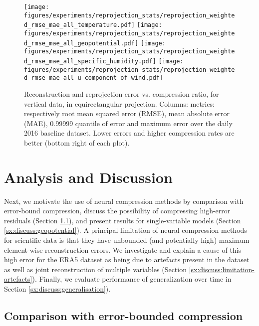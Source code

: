 \documentclass[11pt, a4paper, logo, copyright, numbering]{googledeepmind}
\begin{document}
\begin{figure}
    \centering
    \texttt{[image: figures/experiments/reprojection\_stats/reprojection\_weighted\_rmse\_mae\_all\_temperature.pdf]}
    \texttt{[image: figures/experiments/reprojection\_stats/reprojection\_weighted\_rmse\_mae\_all\_geopotential.pdf]}
    \texttt{[image: figures/experiments/reprojection\_stats/reprojection\_weighted\_rmse\_mae\_all\_specific\_humidity.pdf]}
    \texttt{[image: figures/experiments/reprojection\_stats/reprojection\_weighted\_rmse\_mae\_all\_u\_component\_of\_wind.pdf]}
    \hfill
    \caption{Reconstruction and reprojection error vs. compression ratio, for vertical data, in equirectangular projection. Columns: metrics: respectively root mean squared error (RMSE), mean absolute error (MAE), 0.99999 quantile of error and maximum error over the daily 2016 baseline dataset. Lower errors and higher compression rates are better (bottom right of each plot).}
    \label{fig:reprojection_error_vs_cr}
\end{figure}


 
\section{Analysis and Discussion}
\label{sx:discussion}

Next, we motivate the use of neural compression methods by comparison with error-bound compression, discuss the possibility of compressing high-error residuals (Section \ref{sx:discuss:error-bound}), and present results for single-variable models (Section \ref{sx:discuss:geopotential}). A principal limitation of  neural compression methods for scientific data is that they have unbounded (and potentially high) maximum element-wise reconstruction errors. We investigate and explain a cause of this high error for the ERA5 dataset as being due to artefacts present in the dataset as well as joint reconstruction of multiple variables (Section \ref{sx:discuss:limitation-artefacts}). Finally, we evaluate performance of generalization over time in Section \ref{sx:discuss:generalisation}).


\subsection{Comparison with error-bounded compression}
\label{sx:discuss:error-bound}
\end{document}
